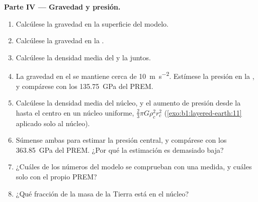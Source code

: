 \begin{problem}
\noindent\textbf{Parte IV --- Gravedad y presión.}
\begin{enumerate}[resume]
  \item Calcúlese la gravedad en la superficie del modelo.
  \item Calcúlese la gravedad en la .
  \item Calcúlese la densidad media del  y la  juntos.
  \item La gravedad en el  se mantiene cerca de \qty{10}{m.s^{-2}}. Estímese la presión en la , y
        compárese con los \qty{135.75}{GPa} del PREM.
  \item Calcúlese la densidad media del núcleo, y el aumento de presión desde la  hasta el centro en un
        núcleo uniforme, $\tfrac23\pi G\rho_c^2 r_c^2$ (\cref{exo:b1:layered-earth:11} aplicado solo al núcleo).
  \item Súmense ambas para estimar la presión central, y compárese con los \qty{363.85}{GPa} del PREM. ¿Por qué la estimación
        es demasiado baja?
  \item ¿Cuáles de los números del modelo se comprueban con una medida, y cuáles solo con el propio PREM?
  \item ¿Qué fracción de la masa de la Tierra está en el núcleo?
\end{enumerate}
\end{problem}
